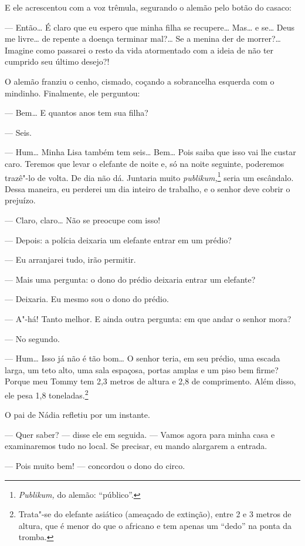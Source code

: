 E ele acrescentou com a voz trêmula, segurando o alemão pelo botão do
casaco:

--- Então\ldots{} É claro que eu espero que minha filha se recupere\ldots{}
Mas\ldots{} e se\ldots{} Deus me livre\ldots{} de repente a doença terminar mal?\ldots{} Se
a menina der de morrer?\ldots{} Imagine como passarei o resto da vida
atormentado com a ideia de não ter cumprido seu último desejo?!

O alemão franziu o cenho, cismado, coçando a sobrancelha esquerda com o
mindinho. Finalmente, ele perguntou:

--- Bem\ldots{} E quantos anos tem sua filha?

--- Seis.

--- Hum\ldots{} Minha Lisa também tem seis\ldots{} Bem\ldots{} Pois saiba que isso vai
lhe custar caro. Teremos que levar o elefante de noite e, só na noite
seguinte, poderemos trazê"-lo de volta. De dia não dá. Juntaria muito
\emph{publikum,}\footnote{\emph{Publikum,} do alemão: ``público''.}
seria um escândalo. Dessa maneira, eu perderei um dia inteiro de
trabalho, e o senhor deve cobrir o prejuízo.

--- Claro, claro\ldots{} Não se preocupe com isso!

--- Depois: a polícia deixaria um elefante entrar em um prédio?

--- Eu arranjarei tudo, irão permitir.

--- Mais uma pergunta: o dono do prédio deixaria entrar um elefante?

--- Deixaria. Eu mesmo sou o dono do prédio.

--- A"-há! Tanto melhor. E ainda outra pergunta: em que andar o senhor
mora?

--- No segundo.

--- Hum\ldots{} Isso já não é tão bom\ldots{} O senhor teria, em seu prédio, uma
escada larga, um teto alto, uma sala espaçosa, portas amplas e um piso
bem firme? Porque meu Tommy tem 2,3 metros de altura e 2,8 de
comprimento. Além disso, ele pesa 1,8 toneladas.\footnote{Trata"-se
  do elefante asiático (ameaçado de extinção), entre 2 e 3 metros de
  altura, que é menor do que o africano e tem apenas um ``dedo'' na
  ponta da tromba.}

O pai de Nádia refletiu por um instante.

--- Quer saber? --- disse ele em seguida. --- Vamos agora para minha
casa e examinaremos tudo no local. Se precisar, eu mando alargarem a
entrada.

--- Pois muito bem! --- concordou o dono do circo.


